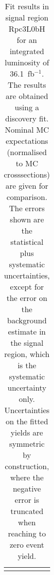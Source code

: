 \begin{table}
\begin{center}
{\begin{tabular*}{\textwidth}{@{\extracolsep{\fill}}lr}
\noalign{\smallskip}\hline\noalign{\smallskip}
\end{tabular*}
}
\end{center}
\caption{Fit results in signal region Rpc3L0bH for an integrated luminosity of 36.1~fb$^{-1}$.
The results are obtained using a discovery fit. Nominal MC expectations (normalised to MC crosssections) are given for comparison.
The errors shown are the statistical plus systematic uncertainties, except for the error on the background estimate in the signal region, which is the systematic uncertainty only.
Uncertainties on the fitted yields are symmetric by construction, where the negative error is truncated when reaching to zero event yield.
}
\label{table.results.systematics.in.logL.fit..Yields.Rpc3L0bH}
\end{table}
\clearpage
%